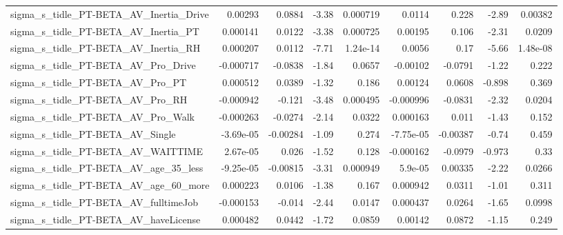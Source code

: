 \begin{tabular}{lrrrrrrrr}
sigma\_s\_tidle\_PT-BETA\_AV\_Inertia\_Drive             &     0.00293 &       0.0884 &    -3.38 & 0.000719 &     0.0114 &       0.228 &        -2.89 &       0.00382 \\
sigma\_s\_tidle\_PT-BETA\_AV\_Inertia\_PT                &    0.000141 &       0.0122 &    -3.38 & 0.000725 &    0.00195 &       0.106 &        -2.31 &        0.0209 \\
sigma\_s\_tidle\_PT-BETA\_AV\_Inertia\_RH                &    0.000207 &       0.0112 &    -7.71 & 1.24e-14 &     0.0056 &        0.17 &        -5.66 &      1.48e-08 \\
sigma\_s\_tidle\_PT-BETA\_AV\_Pro\_Drive                 &   -0.000717 &      -0.0838 &    -1.84 &   0.0657 &   -0.00102 &     -0.0791 &        -1.22 &         0.222 \\
sigma\_s\_tidle\_PT-BETA\_AV\_Pro\_PT                    &    0.000512 &       0.0389 &    -1.32 &    0.186 &    0.00124 &      0.0608 &       -0.898 &         0.369 \\
sigma\_s\_tidle\_PT-BETA\_AV\_Pro\_RH                    &   -0.000942 &       -0.121 &    -3.48 & 0.000495 &  -0.000996 &     -0.0831 &        -2.32 &        0.0204 \\
sigma\_s\_tidle\_PT-BETA\_AV\_Pro\_Walk                  &   -0.000263 &      -0.0274 &    -2.14 &   0.0322 &   0.000163 &       0.011 &        -1.43 &         0.152 \\
sigma\_s\_tidle\_PT-BETA\_AV\_Single                    &   -3.69e-05 &     -0.00284 &    -1.09 &    0.274 &  -7.75e-05 &    -0.00387 &        -0.74 &         0.459 \\
sigma\_s\_tidle\_PT-BETA\_AV\_WAITTIME                  &    2.67e-05 &        0.026 &    -1.52 &    0.128 &  -0.000162 &     -0.0979 &       -0.973 &          0.33 \\
sigma\_s\_tidle\_PT-BETA\_AV\_age\_35\_less               &   -9.25e-05 &     -0.00815 &    -3.31 & 0.000949 &    5.9e-05 &     0.00335 &        -2.22 &        0.0266 \\
sigma\_s\_tidle\_PT-BETA\_AV\_age\_60\_more               &    0.000223 &       0.0106 &    -1.38 &    0.167 &   0.000942 &      0.0311 &        -1.01 &         0.311 \\
sigma\_s\_tidle\_PT-BETA\_AV\_fulltimeJob               &   -0.000153 &       -0.014 &    -2.44 &   0.0147 &   0.000437 &      0.0264 &        -1.65 &        0.0998 \\
sigma\_s\_tidle\_PT-BETA\_AV\_haveLicense               &    0.000482 &       0.0442 &    -1.72 &   0.0859 &    0.00142 &      0.0872 &        -1.15 &         0.249 \\

\end{tabular}
